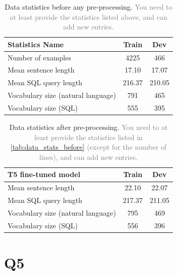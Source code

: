 \documentclass{article}
\begin{document}
\begin{table}[h!]
  \centering
  \begin{tabular}{lcc}
    \toprule
    Statistics Name & Train & Dev \\
    \midrule
    Number of examples & 4225 & 466 \\
    Mean sentence length & 17.10 & 17.07 \\
    Mean SQL query length & 216.37 & 210.05  \\
    Vocabulary size (natural language)& 791 & 465  \\
    Vocabulary size (SQL)& 555 & 395  \\
    \bottomrule
  \end{tabular}
  \caption{Data statistics before any pre-processing.
    \textcolor{gray}{You need to at least provide the statistics listed
  above, and can add new entries.}}
  \label{tab:data_stats_before}
\end{table}

\begin{table}[h!]
  \centering
  \begin{tabular}{lcc}
    \toprule
    \textbf{T5 fine-tuned model} & Train & Dev \\
    \midrule
    Mean sentence length & 22.10 & 22.07 \\
    Mean SQL query length & 217.37 & 211.05 \\
    Vocabulary size (natural language) & 795 & 469 \\
    Vocabulary size (SQL) & 556 & 396 \\
    \midrule
    \bottomrule
  \end{tabular}
  \caption{Data statistics after pre-processing. \textcolor{gray}{You
      need to at least provide the statistics listed in
      \autoref{tab:data_stats_before} (except for the number of lines),
  and can add new entries.}}
  \label{tab:data_stats_after}
\end{table}

\newpage

\section*{Q5}\label{sec:t5}
\end{document}
